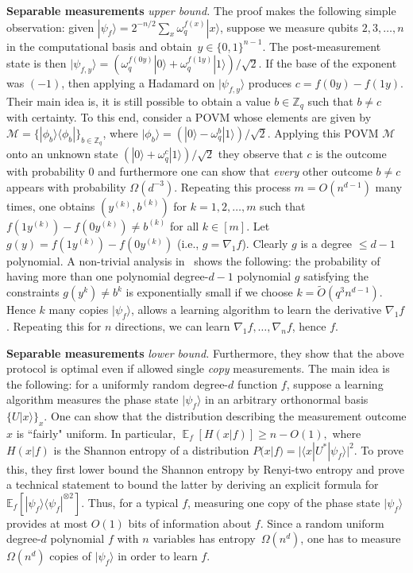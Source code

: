 \documentclass[11pt]{article}
\newcommand{\M}{\mathcal{M}}
\newcommand{\ket}[1]{|#1\rangle}
\newcommand{\ketbra}[2]{|#1\rangle\langle#2|}
\newcommand{\ra}{\rangle}
\newcommand{\la}{\langle}
\newcommand{\EE}{\mathbb{E}}
\newcommand{\ZZ}{\mathbb{Z}}
\begin{document}
\textbf{Separable measurements} \emph{upper bound.} The proof makes the following simple observation: given $\ket{\psi_f}=2^{-n/2}\sum_x \omega_q^{f(x)}\ket{x}$, suppose we measure qubits $2,3,\ldots,n$ in the computational basis and  obtain~$y \in \{0,1\}^{n-1}$. The post-measurement state is then  
$
\ket{\psi_{f,y}} = ( \omega_q^{f(0y)} \ket{0} + \omega_q^{f(1y)} \ket{1})/\sqrt{2}.
$ 
If the base of the exponent was $(-1)$, then applying a Hadamard on $\ket{\psi_{f,y}}$ produces $c=f(0y)-f(1y)$. Their main idea is, it is still possible to obtain a value $b\in \ZZ_q$ such that $b\neq c$ with certainty. To this end, consider a POVM whose elements are given by $\M=\{\ketbra{\phi_b}{\phi_b}\}_{b\in \ZZ_q}$,
where $\ket{\phi_b}=( \ket{0} - \omega_q^{b} \ket{1})/\sqrt{2}$.
 Applying this POVM $\M$ onto an unknown state $(|0\ra+\omega_q^c|1\ra)/\sqrt{2}$ they observe that $c$ is the outcome with probability $0$ and furthermore one can show that \emph{every} other outcome $b\ne c$ appears with  probability $\Omega(d^{-3})$. Repeating this process $m=O(n^{d-1})$ many times, one obtains $(y^{(k)},b^{(k)})$ for $k=1,2,\ldots,m$ such that $f(1y^{(k)})-f(0y^{(k)})\neq b^{(k)}$ for all $k \in [m]$. Let $g(y)=f(1y^{(k)})-f(0y^{(k)})$ (i.e., $g=\nabla_1 f$). Clearly $g$ is a degree $\leq d-1$ polynomial. A non-trivial analysis in~\cite{DBLP:journals/corr/abs-2208-07851} shows the following:  the probability of having more than one polynomial 
degree-$d-1$ polynomial $g$ satisfying the constraints $g(y^k)\neq b^k$ is exponentially small if we choose $k=\tilde{O}(q^3 n^{d-1})$. Hence $k$ many copies $\ket{\psi_f}$, allows a learning algorithm to learn the derivative $\nabla_1 f$. Repeating this for $n$ directions, we can learn $\nabla_1 f,\ldots,\nabla_n f$, hence $f$. 


\textbf{Separable measurements} \emph{lower bound.} Furthermore, they show that the above protocol is optimal even if allowed  single \emph{copy} measurements. The main  idea is the following: for a uniformly random degree-$d$ function $f$, suppose a learning algorithm measures the phase state $\ket{\psi_f}$ in an arbitrary orthonormal basis $\{U\ket{x}\}_x$. One can  show that the distribution describing the measurement outcome $x$ is ``fairly" uniform. In particular, 
$    \mathop{\mathbb{E}}_f [H(x|f)]\ge n - O(1), 
$ where $H(x|f)$ is the Shannon entropy of
a distribution $P(x|f)=|\la x|U^*|\psi_f\ra|^2$. To prove this, they first lower bound the Shannon entropy by Renyi-two entropy and prove a technical statement to bound the latter by deriving  an explicit formula for $\EE_f [|\psi_f\ra\la \psi_f|^{\otimes 2}]$. Thus, for a typical $f$, measuring one copy of the phase state $\ket{\psi_f}$ provides at most $O(1)$ bits of information about $f$. Since a random uniform
degree-$d$ polynomial $f$ with $n$ variables has entropy~$\Omega(n^d)$, one has to measure $\Omega(n^d)$ 
copies of $\ket{\psi_f}$ in order to learn $f$.
\end{document}
